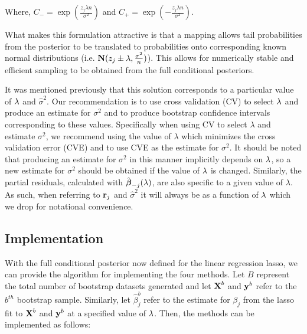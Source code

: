 Where, $C_{-} = \exp(\frac{z_j \lambda n}{\sigma^2})$ and $C_{+} = \exp(-\frac{z_j \lambda n}{\sigma^2})$.

What makes this formulation attractive is that a mapping allows tail probabilities from the posterior to be translated to probabilities onto corresponding known normal distributions (i.e. $\mathbf{N}(z_j \pm \lambda, \frac{\sigma^2}{n})$). This allows for numerically stable and efficient sampling to be obtained from the full conditional posteriors.

It was mentioned previously that this solution corresponds to a particular value of $\lambda$ and $\hat{\sigma}^2$. Our recommendation is to use cross validation (CV) to select $\lambda$ and produce an estimate for $\sigma^2$ and to produce bootstrap confidence intervals corresponding to these values. Specifically when using CV to select $\lambda$ and estimate $\sigma^2$, we recommend using the value of $\lambda$ which minimizes the cross validation error (CVE) and to use CVE as the estimate for $\sigma^2$. It should be noted that producing an estimate for $\sigma^2$ in this manner implicitly depends on $\lambda$, so a new estimate for $\sigma^2$ should be obtained if the value of $\lambda$ is changed. Similarly, the partial residuals, calculated with $\hat{\boldsymbol{\beta}}_{-j}(\lambda)$, are also specific to a given value of $\lambda$. As such, when referring to $\mathbf{r}_{j}$ and $\hat{\sigma}^2$ it will always be as a function of $\lambda$ which we drop for notational convenience.


\subsection{Implementation}
\label{Sec:implementation}


With the full conditional posterior now defined for the linear regression lasso, we can provide the algorithm for implementing the four methods. Let $B$ represent the total number of bootstrap datasets generated and let $\boldsymbol{\mathbf{X}}^b$ and $\boldsymbol{\mathbf{y}}^{b}$ refer to the $b^{th}$ bootstrap sample. Similarly, let $\hat{\beta}^b_j$ refer to the estimate for $\beta_j$ from the lasso fit to $\boldsymbol{\mathbf{X}}^b$ and $\boldsymbol{\mathbf{y}}^b$ at a specified value of $\lambda$. Then, the methods can be implemented as follows:

